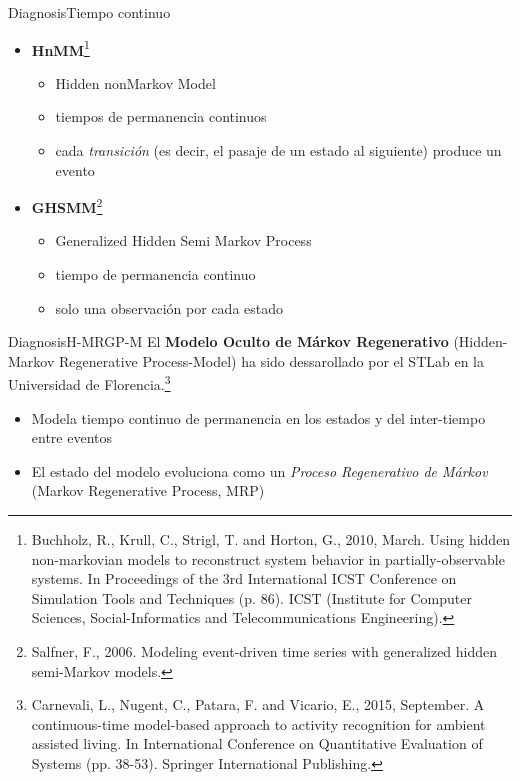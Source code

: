 \documentclass[9pt, handout]{beamer}
\begin{document}
      \begin{frame}{Diagnosis}{Tiempo continuo}
        \begin{itemize}
          \item \textbf{HnMM}\footnote{Buchholz, R., Krull, C., Strigl, T. and Horton, G., 2010, March. Using hidden non-markovian models to reconstruct system behavior in partially-observable systems. In Proceedings of the 3rd International ICST Conference on Simulation Tools and Techniques (p. 86). ICST (Institute for Computer Sciences, Social-Informatics and Telecommunications Engineering).}
          \begin{itemize}
            \item Hidden nonMarkov Model
            \item tiempos de permanencia continuos
            \item cada \textit{transición} (es decir, el pasaje de un estado al siguiente) produce un evento
          \end{itemize}
          \item \textbf{GHSMM}\footnote{Salfner, F., 2006. Modeling event-driven time series with generalized hidden semi-Markov models.}
          \begin{itemize}
            \item Generalized Hidden Semi Markov Process
            \item tiempo de permanencia continuo
            \item solo una observación por cada estado
          \end{itemize}
        \end{itemize}
      \end{frame}
      
      \begin{frame}{Diagnosis}{H-MRGP-M}
        El \textbf{Modelo Oculto de Márkov Regenerativo} (Hidden-Markov Regenerative Process-Model) ha sido dessarollado por el STLab en la Universidad de Florencia.\footnote{Carnevali, L., Nugent, C., Patara, F. and Vicario, E., 2015, September. A continuous-time model-based approach to activity recognition for ambient assisted living. In International Conference on Quantitative Evaluation of Systems (pp. 38-53). Springer International Publishing.}
        
        \begin{itemize}
          \item Modela tiempo continuo de permanencia en los estados y del inter-tiempo entre eventos
          \item El estado del modelo evoluciona como un \textit{Proceso Regenerativo de Márkov} (Markov Regenerative Process, MRP)
        \end{itemize}
      \end{frame}
      
\end{document}

